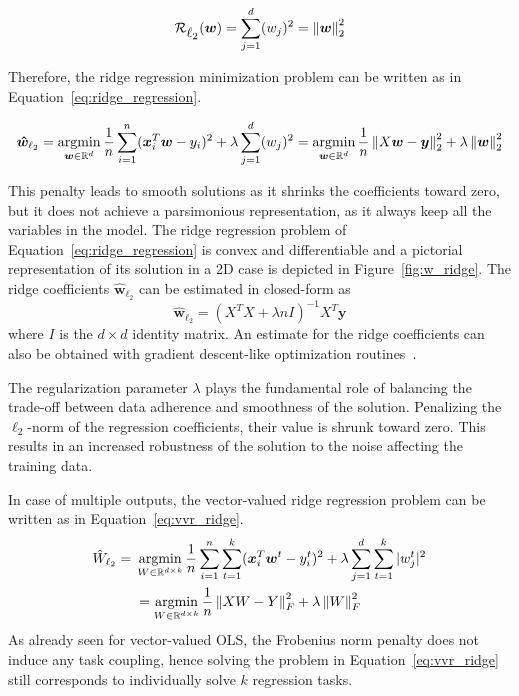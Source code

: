 			\begin{equation}\label{eq:l2}
				\mathcal{R}_{\mbox{$\ell_2$}}(\bm{w}) = \sum_{j=1}^d (w_j)^2 = \left\lVert\bm{w}\right\rVert_2^2
			\end{equation}

			Therefore, the ridge regression minimization problem can be written as in Equation~\eqref{eq:ridge_regression}.

			\begin{equation} \label{eq:ridge_regression}
				\bm{\hat w}_{\ell_2} = \mathop{\mathrm{argmin}}\limits_{\bm{w} \in \mathbb{R}^d} \frac{1}{n} \sum_{i=1}^n (\bm{x}_i^T\bm{w} - y_i)^2 + \lambda  \sum_{j=1}^d (w_j)^2 = \mathop{\mathrm{argmin}}\limits_{\bm{w} \in \mathbb{R}^d} \frac{1}{n} \left\lVert X\bm{w} - \bm{y}\right\rVert_2^2 + \lambda \left\lVert\bm{w}\right\rVert_2^2
			\end{equation}

			This penalty leads to smooth solutions as it shrinks the coefficients toward zero, but it does not achieve a parsimonious representation, as it always keep all the variables in the model.
			The ridge regression problem of Equation~\eqref{eq:ridge_regression} is convex  and differentiable and a pictorial representation of its solution in a 2D case is depicted in Figure~\ref{fig:w_ridge}. The ridge coefficients $\bm{\hat w}_{\ell_2}$ can be estimated in closed-form as
			$$
				\bm{\hat w}_{\ell_2} = (X^TX + \lambda n I)^{-1}X^T\bm{y}
			$$
			where $I$ is the $d \times d$ identity matrix. An estimate for the ridge coefficients can also be obtained with gradient descent-like optimization routines~\cite{boyd2004convex, sra2012optimization}.

			The regularization parameter $\lambda$ plays the fundamental role of balancing the trade-off between data adherence and smoothness of the solution.
			Penalizing the $\ell_2$-norm of the regression coefficients, their value is shrunk toward zero. This results in an increased robustness of the solution to the noise affecting the training data.

			In case of multiple outputs, the vector-valued ridge regression problem can be written as in Equation~\eqref{eq:vvr_ridge}.
			\begin{equation} \label{eq:vvr_ridge}
				\begin{aligned}
					\hat W_{\ell_2}={} & \mathop{\mathrm{argmin}}\limits_{W \in \mathbb{R}^{d \times k}} \frac{1}{n} \sum_{i=1}^n \sum_{t=1}^k (\bm{x}_i^T\bm{w}^t - y_i^t)^2  + \lambda \sum_{j=1}^d \sum_{t=1}^k |w_j^t|^2\\
					& =	\mathop{\mathrm{argmin}}\limits_{W \in \mathbb{R}^{d \times k}} \frac{1}{n} \left\lVert XW - Y\right\rVert_F^2 + \lambda \left\lVert W\right\rVert_F^2
				\end{aligned}
			\end{equation}
			As already seen for vector-valued OLS, the Frobenius norm penalty does not induce any task coupling, hence solving the problem in Equation~\eqref{eq:vvr_ridge} still corresponds to individually solve $k$ regression tasks.

